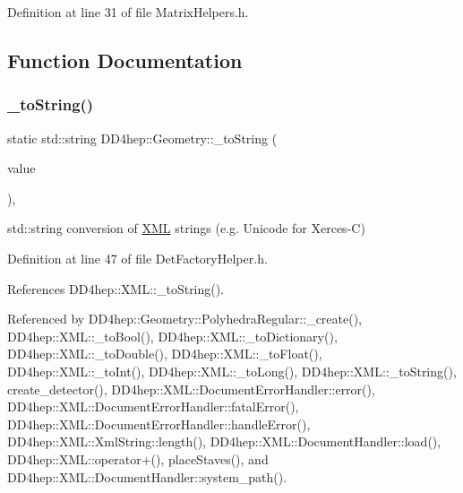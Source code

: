 Definition at line 31 of file Matrix\+Helpers.\+h.



\subsection{Function Documentation}
\hypertarget{namespace_d_d4hep_1_1_geometry_abb6544cdd599b803023143aefeec44d7}{}\label{namespace_d_d4hep_1_1_geometry_abb6544cdd599b803023143aefeec44d7} 
\subsubsection{\texorpdfstring{\+\_\+to\+String()}{\_toString()}\hspace{0.1cm}{\footnotesize\ttfamily [1/2]}}
{\footnotesize\ttfamily static std\+::string D\+D4hep\+::\+Geometry\+::\+\_\+to\+String (\begin{DoxyParamCaption}\item[{const \hyperlink{namespace_d_d4hep_1_1_x_m_l_a09e5d9cc86ed782f6826dfe0778c1815}{D\+D4hep\+::\+X\+M\+L\+::\+Xml\+Char} $\ast$}]{value }\end{DoxyParamCaption})\hspace{0.3cm}{\ttfamily [inline]}, {\ttfamily [static]}}



std\+::string conversion of \hyperlink{namespace_d_d4hep_1_1_x_m_l}{X\+ML} strings (e.\+g. Unicode for Xerces-\/C) 



Definition at line 47 of file Det\+Factory\+Helper.\+h.



References D\+D4hep\+::\+X\+M\+L\+::\+\_\+to\+String().



Referenced by D\+D4hep\+::\+Geometry\+::\+Polyhedra\+Regular\+::\+\_\+create(), D\+D4hep\+::\+X\+M\+L\+::\+\_\+to\+Bool(), D\+D4hep\+::\+X\+M\+L\+::\+\_\+to\+Dictionary(), D\+D4hep\+::\+X\+M\+L\+::\+\_\+to\+Double(), D\+D4hep\+::\+X\+M\+L\+::\+\_\+to\+Float(), D\+D4hep\+::\+X\+M\+L\+::\+\_\+to\+Int(), D\+D4hep\+::\+X\+M\+L\+::\+\_\+to\+Long(), D\+D4hep\+::\+X\+M\+L\+::\+\_\+to\+String(), create\+\_\+detector(), D\+D4hep\+::\+X\+M\+L\+::\+Document\+Error\+Handler\+::error(), D\+D4hep\+::\+X\+M\+L\+::\+Document\+Error\+Handler\+::fatal\+Error(), D\+D4hep\+::\+X\+M\+L\+::\+Document\+Error\+Handler\+::handle\+Error(), D\+D4hep\+::\+X\+M\+L\+::\+Xml\+String\+::length(), D\+D4hep\+::\+X\+M\+L\+::\+Document\+Handler\+::load(), D\+D4hep\+::\+X\+M\+L\+::operator+(), place\+Staves(), and D\+D4hep\+::\+X\+M\+L\+::\+Document\+Handler\+::system\+\_\+path().

